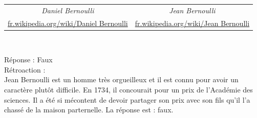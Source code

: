 \documentclass[letterpaper, 12pt]{article}
\begin{document}
\begin{center}
\begin{tabular}{c  c}
\emph{{\small Daniel Bernoulli}} & \emph{{\small Jean Bernoulli}}\\
\href{http://fr.wikipedia.org/wiki/Daniel_Bernoulli}{fr.wikipedia.org/wiki/Daniel Bernoulli} & \href{http://fr.wikipedia.org/wiki/Jean_Bernoulli}{fr.wikipedia.org/wiki/Jean Bernoulli}\\
\end{tabular}\\
\end{center}

R\'eponse : Faux\\

R\'etroaction :\\
Jean Bernoulli est un homme tr\`es orgueilleux et il est connu pour avoir un caract\`ere plut\^ot difficile. En 1734, il concourait pour un prix de l'Acad\'emie des sciences. Il a \'et\'e si m\'econtent de devoir partager son prix avec son fils qu'il l'a chass\'e de la maison parternelle. La r\'eponse est : faux.\\
\end{document}
